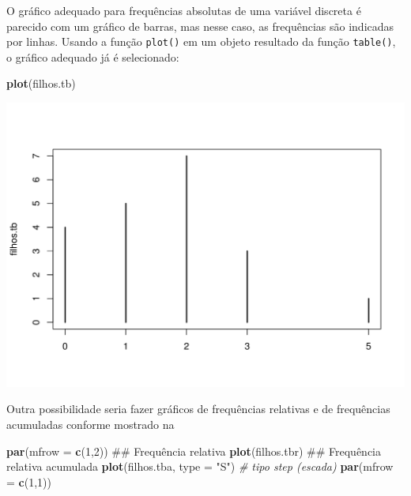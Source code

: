 \documentclass[10pt,a4paper]{book}
\newenvironment{Shaded}{\begin{snugshade}}{\end{snugshade}}
\newcommand{\KeywordTok}[1]{\textcolor[rgb]{0.13,0.29,0.53}{\textbf{#1}}}
\newcommand{\DataTypeTok}[1]{\textcolor[rgb]{0.13,0.29,0.53}{#1}}
\newcommand{\DecValTok}[1]{\textcolor[rgb]{0.00,0.00,0.81}{#1}}
\newcommand{\StringTok}[1]{\textcolor[rgb]{0.31,0.60,0.02}{#1}}
\newcommand{\CommentTok}[1]{\textcolor[rgb]{0.56,0.35,0.01}{\textit{#1}}}
\newcommand{\NormalTok}[1]{#1}
\begin{document}
O gráfico adequado para frequências absolutas de uma variável discreta é
parecido com um gráfico de barras, mas nesse caso, as frequências são
indicadas por linhas. Usando a função \texttt{plot()} em um objeto
resultado da função \texttt{table()}, o gráfico adequado já é
selecionado:

\begin{Shaded}
\begin{Highlighting}[]
\KeywordTok{plot}\NormalTok{(filhos.tb)}
\end{Highlighting}
\end{Shaded}

\begin{center}\includegraphics{figures/unnamed-chunk-299-1} \end{center}

Outra possibilidade seria fazer gráficos de frequências relativas e de
frequências acumuladas conforme mostrado na

\begin{Shaded}
\begin{Highlighting}[]
\KeywordTok{par}\NormalTok{(}\DataTypeTok{mfrow =} \KeywordTok{c}\NormalTok{(}\DecValTok{1}\NormalTok{,}\DecValTok{2}\NormalTok{))}
\NormalTok{## Frequência relativa}
\KeywordTok{plot}\NormalTok{(filhos.tbr)}
\NormalTok{## Frequência relativa acumulada}
\KeywordTok{plot}\NormalTok{(filhos.tba, }\DataTypeTok{type =} \StringTok{"S"}\NormalTok{) }\CommentTok{# tipo step (escada)}
\KeywordTok{par}\NormalTok{(}\DataTypeTok{mfrow =} \KeywordTok{c}\NormalTok{(}\DecValTok{1}\NormalTok{,}\DecValTok{1}\NormalTok{))}
\end{Highlighting}
\end{Shaded}
\end{document}
